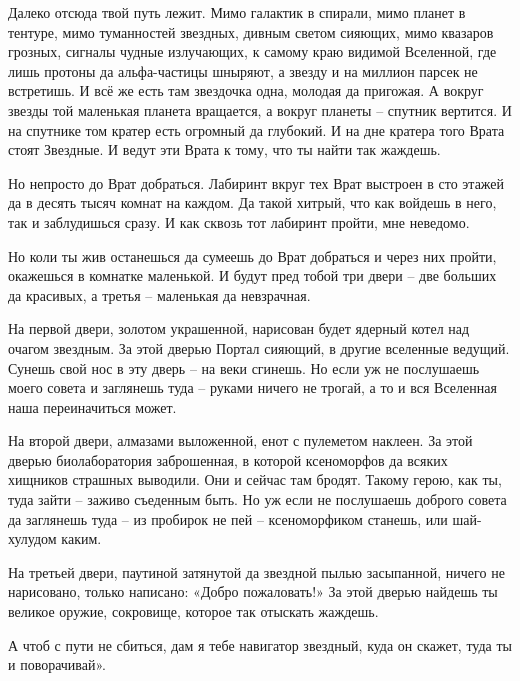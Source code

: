 \documentclass[ebook,oneside,final,openright]{memoir}
\begin{document}
\par
Далеко отсюда твой путь лежит. Мимо галактик в спирали, мимо планет в тентуре, мимо туманностей звездных, дивным светом сияющих, мимо квазаров грозных, сигналы чудные излучающих, к самому краю видимой Вселенной, где лишь протоны да альфа-частицы шныряют, а звезду и на миллион парсек не встретишь. И всё же есть там звездочка одна, молодая да пригожая. А вокруг звезды той маленькая планета вращается, а вокруг планеты – спутник вертится. И на спутнике том кратер есть огромный да глубокий. И на дне кратера того Врата стоят Звездные. И ведут эти Врата к тому, что ты найти так жаждешь.\par
\par
Но непросто до Врат добраться. Лабиринт вкруг тех Врат выстроен в сто этажей да в десять тысяч комнат на каждом. Да такой хитрый, что как войдешь в него, так и заблудишься сразу. И как сквозь тот лабиринт пройти, мне неведомо.\par
\par
Но коли ты жив останешься да сумеешь до Врат добраться и через них пройти, окажешься в комнатке маленькой. И будут пред тобой три двери – две больших да красивых, а третья – маленькая да невзрачная.\par
\par
На первой двери, золотом украшенной, нарисован будет ядерный котел над очагом звездным. За этой дверью Портал сияющий, в другие вселенные ведущий. Сунешь свой нос в эту дверь – на веки сгинешь. Но если уж не послушаешь моего совета и заглянешь туда – руками ничего не трогай, а то и вся Вселенная наша переиначиться может.\par
\par
На второй двери, алмазами выложенной, енот с пулеметом наклеен. За этой дверью биолаборатория заброшенная, в которой ксеноморфов да всяких хищников страшных выводили. Они и сейчас там бродят. Такому герою, как ты, туда зайти – заживо съеденным быть. Но уж если не послушаешь доброго совета да заглянешь туда – из пробирок не пей – ксеноморфиком станешь, или шай-хулудом каким.\par
\par
На третьей двери, паутиной затянутой да звездной пылью засыпанной, ничего не нарисовано, только написано: «Добро пожаловать!» За этой дверью найдешь ты великое оружие, сокровище, которое так отыскать жаждешь.\par
\par
А чтоб с пути не сбиться, дам я тебе навигатор звездный, куда он скажет, туда ты и поворачивай».\par
\end{document}
